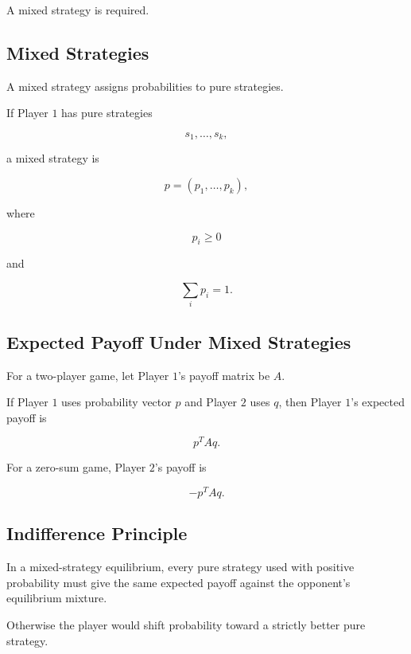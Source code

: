 A mixed strategy is required.

\subsection{Mixed Strategies}
\label{subsec:mixed-strategies}

A mixed strategy assigns probabilities to pure strategies.

If Player \(1\) has pure strategies

\[
s_1,\ldots,s_k,
\]

a mixed strategy is

\[
\boxed{
p
=
(p_1,\ldots,p_k),
}
\]

where

\[
p_i\geq0
\]

and

\[
\boxed{
\sum_i
p_i=1.
}
\]

\subsection{Expected Payoff Under Mixed Strategies}
\label{subsec:mixed-strategy-expected-payoff}

For a two-player game, let Player \(1\)'s payoff matrix be \(A\).

If Player \(1\) uses probability vector \(p\) and Player \(2\) uses \(q\),
then Player \(1\)'s expected payoff is

\[
\boxed{
p^TAq.
}
\]

For a zero-sum game, Player \(2\)'s payoff is

\[
\boxed{
-p^TAq.
}
\]

\subsection{Indifference Principle}
\label{subsec:mixed-strategy-indifference}

In a mixed-strategy equilibrium, every pure strategy used with positive
probability must give the same expected payoff against the opponent's
equilibrium mixture.

Otherwise the player would shift probability toward a strictly better
pure strategy.

